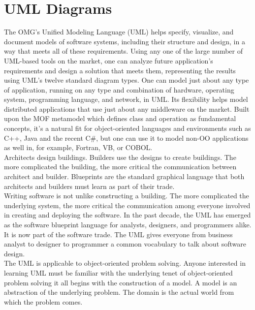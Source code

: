 \section{UML Diagrams}
\hspace*{0.82cm}The OMG's Unified Modeling Language (UML) helps specify, visualize, and
document models of software systems, including their structure and design, in a way that
meets all of these requirements. Using any one of the large number of UML-based tools on
the market, one can analyze future application's requirements and design a solution that meets
them, representing the results using UML's twelve standard diagram types. One can model
just about any type of application, running on any type and combination of hardware,
operating system, programming language, and network, in UML. Its flexibility helps model
distributed applications that use just about any middleware on the market. Built upon the
MOF metamodel which defines class and operation as fundamental concepts, it's a natural fit
for object-oriented languages and environments such as C++, Java and the recent C\#, but one
can use it to model non-OO applications as well in, for example, Fortran, VB, or COBOL.\\[0.5cm]
\hspace*{0.82cm}Architects design buildings. Builders use the designs to create buildings. The more
complicated the building, the more critical the communication between architect and builder.
Blueprints are the standard graphical language that both architects and builders must learn as
part of their trade.\\[0.5cm]
\hspace*{0.82cm}Writing software is not unlike constructing a building. The more complicated the
underlying system, the more critical the communication among everyone involved in creating
and deploying the software. In the past decade, the UML has emerged as the software
blueprint language for analysts, designers, and programmers alike. It is now part of the
software trade. The UML gives everyone from business analyst to designer to programmer a
common vocabulary to talk about software design.\\[0.5cm]
\hspace*{0.82cm}The UML is applicable to object-oriented problem solving. Anyone interested in
learning UML must be familiar with the underlying tenet of object-oriented problem solving 
it all begins with the construction of a model. A model is an abstraction of the underlying
problem. The domain is the actual world from which the problem comes.\\[0.5cm]
